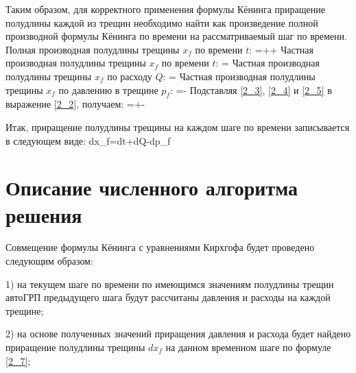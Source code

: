 Таким образом, для корректного применения формулы Кёнинга приращение полудлины каждой из трещин необходимо найти как произведение полной производной формулы Кёнинга по времени на рассматриваемый шаг по времени.\newline
Полная производная полудлины трещины $x_{\!f}$ по времени $t$:
\beq\label{2_2}
=++
\eeq
Частная производная полудлины трещины $x_{\!f}$ по времени $t$:
\beq\label{2_3}
=
\eeq
Частная производная полудлины трещины $x_{\!f}$ по расходу $Q$:
\beq\label{2_4}
=
\eeq
Частная производная полудлины трещины $x_{\!f}$ по давлению в трещине $p_{\!f}$:
\beq\label{2_5}
=-
\eeq
Подставляя \eqref{2_3}, \eqref{2_4} и \eqref{2_5} в выражение \eqref{2_2}, получаем:
\beq\label{2_6}
=+-
\eeq

Итак, приращение полудлины трещины на каждом шаге по времени записывается в следующем виде:
\beq\label{2_7}
dx_{\!f}=dt+dQ-dp_{\!f}
\eeq\\

\section{Описание численного алгоритма решения}

Совмещение формулы Кёнинга с уравнениями Кирхгофа будет проведено следующим образом:

1) на текущем шаге по времени по имеющимся значениям полудлины трещин автоГРП предыдущего шага будут рассчитаны давления и расходы на каждой трещине;

2) на основе полученных значений приращения давления и расхода будет найдено приращение полудлины трещины $dx_{\!f}$ на данном временном шаге по формуле \eqref{2_7};

